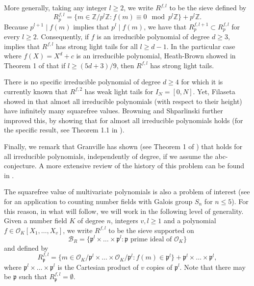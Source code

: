 \documentclass[a4paper,11pt,reqno]{amsart}
\theoremstyle{plain}
\theoremstyle{remark}
\newcommand{\z}{\mathbb{Z}}
\newcommand{\cb}{\mathcal{B}}
\newcommand{\co}{\mathcal{O}}
\newcommand{\gp}{\mathfrak{p}}
\begin{document}
				More generally, taking any integer $l \geq 2$, we write $R^{f,l}$ to be the sieve defined by \begin{equation}
					\label{eq: R fl}
					R^{f,l}_p = \{m \in \z/p^{l}\z: f(m) \equiv 0 \mod p^{l}\z \} + p^{l}\z.
				\end{equation} Because $p^{l+1}\mid f(m)$ implies that $p^{l}\mid f(m)$, we have that $R^{f,l+1}_p \subset R^{f,l}_p$ for every $l \geq 2$. Consequently, if $f$ is an irreducible polynomial of degree $d \geq 3$,  implies that $R^{f,l}$ has strong light tails for all $l \geq d-1$. In the particular case where $f(X) = X^d+c$ is an irreducible polynomial, Heath-Brown showed in Theorem 1 of \cite{HeathBrown2} that if $l \geq (5d+3)/9$, then $R^{f,l}$ has strong light tails. 
				
				There is no specific irreducible polynomial of degree $d\geq 4$ for which it is currently known that $R^{f,2}$ has weak light tails for $I_N = [0,N]$. Yet, Filaseta showed in \cite{Filaseta} that almost all irreducible polynomials (with respect to their height) have infinitely many squarefree values. Browning and Shparlinski further improved this, by showing that for almost all irreducible polynomials  holds (for the specific result, see Theorem 1.1 in \cite{Brwoning}).
				
				Finally, we remark that Granville has shown (see Theorem 1 of \cite{granville}) that  holds for all irreducible polynomials, independently of degree, if we assume the abc-conjecture. A more extensive review of the history of this problem can be found in \cite{Kowalski}.
				
				The squarefree value of multivariate polynomials is also a problem of interest (see \cite{Bhargava} for an application to counting number fields with Galois group $S_n$ for $n \leq 5$). For this reason, in what will follow, we will work in the following level of generality. Given a number field $K$ of degree $n$, integers $v,l \geq 1$ and a polynomial $f \in \co_K[X_1,\dots, X_v]$, we write $R^{f,l}$ to be the sieve supported on $$\cb_R = \{\gp^l \times \dots \times \gp^l: \gp \text{ prime ideal of } \co_K\}$$ and defined by $$R^{f,l}_\gp = \{m \in \co_K/\gp^l \times \dots \times \co_K/\gp^l: f(m) \in \gp^l\} + \gp^l \times \dots \times \gp^l,$$ where $\gp^l \times \dots \times \gp^l$ is the Cartesian product of $v$ copies of $\gp^l$. Note that there may be $\gp$ such that $R^{f,l}_\gp = \emptyset$.
				
\end{document}
